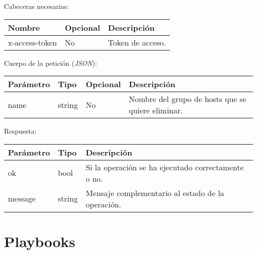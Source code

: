 Cabeceras necesarias:
\begin{table}[h!]
	\centering
	\begin{adjustbox}{max width=\textwidth}
	\begin{tabular}{|l|l|l|}
		\hline
		Nombre & Opcional & Descripción \\ \hline
		x-access-token & No & Token de acceso. \\ \hline
	\end{tabular}
\end{adjustbox}
\end{table}

Cuerpo de la petición (\textit{JSON}):
\begin{table}[h!]
	\centering
	\begin{adjustbox}{max width=\textwidth}
	\begin{tabular}{|l|l|l|l|}
		\hline
		Parámetro & Tipo & Opcional & Descripción \\ \hline
		name & string & No & Nombre del grupo de hosts que se quiere eliminar. \\ \hline
	\end{tabular}
\end{adjustbox}
\end{table}


\pagebreak
Respuesta:
\begin{table}[h!]
	\centering
	\begin{adjustbox}{max width=\textwidth}
	\begin{tabular}{|l|l|l|}
		\hline
		Parámetro & Tipo & Descripción \\ \hline
		ok & bool & Si la operación se ha ejecutado correctamente o no. \\ \hline
		message & string & Mensaje complementario al estado de la operación. \\ \hline
	\end{tabular}
\end{adjustbox}
\end{table}







\section{Playbooks}

